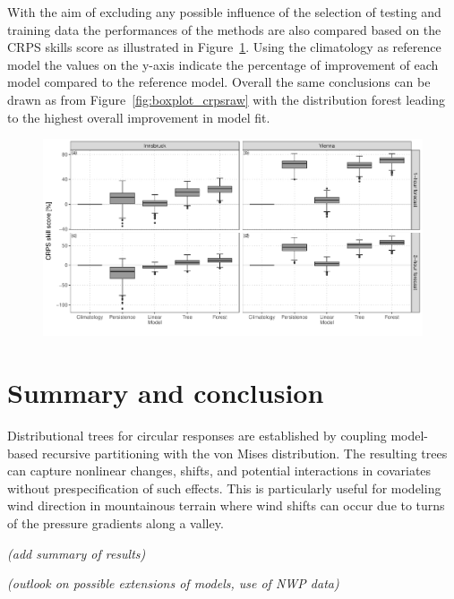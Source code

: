 \documentclass[nojss]{jss}
\newcommand{\fixme}[1]{\emph{\marginpar{FIXME} (#1)}}
\numberwithin{equation}{section}
\begin{document}
With the aim of excluding any possible influence of the selection of testing and training data
the performances of the methods are also compared based on the CRPS skills score as illustrated in 
Figure~\ref{fig:boxplot_crpsskill}. Using the climatology as reference model the values on the y-axis
indicate the percentage of improvement of each model compared to the reference model. Overall
the same conclusions can be drawn as from Figure~\ref{fig:boxplot_crpsraw} with the distribution
forest leading to the highest overall improvement in model fit.

\begin{figure}[t]
\centering
{}
\includegraphics{_plot_circforest_validation_crpsskill_agg_comparison_with_lowff_v14b.pdf}
\caption{}
\label{fig:boxplot_crpsskill} 
\end{figure}


\section{Summary and conclusion}
Distributional trees for circular responses are established by coupling
model-based recursive partitioning with the von Mises distribution.
The resulting trees can capture nonlinear changes, shifts, and potential interactions
in covariates without prespecification of such effects. This is particularly
useful for modeling wind direction in mountainous terrain where wind shifts
can occur due to turns of the pressure gradients along a valley.

\fixme{add summary of results}

\fixme{outlook on possible extensions of models, use of NWP data}

\end{document}
